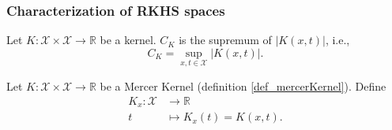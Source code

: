 
\subsubsection{Characterization of RKHS spaces} \label{sec_characterizationRKHS}

\begin{definition}
  Let $K: \mathcal{X} \times \mathcal{X} \to \mathbb{R}$ be a kernel. $C_K$ is the supremum of $|K(x,t)|$, i.e.,
  \begin{equation*}
    C_K = \sup_{x,t \in \mathcal{X}} |K(x,t)|.
  \end{equation*}
\end{definition}

\begin{definition}
  Let $K: \mathcal{X} \times \mathcal{X} \to \mathbb{R}$ be a Mercer Kernel (definition \ref{def_mercerKernel}). Define
  \begin{equation*}
    \begin{aligned}
      K_x : \mathcal{X} &\to     \mathbb{R} \\
            t &\mapsto K_x(t) = K(x,t).
    \end{aligned}
  \end{equation*}
\end{definition}

